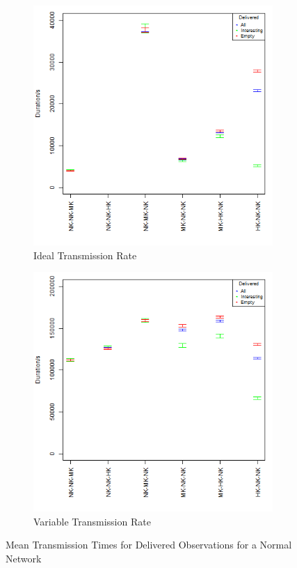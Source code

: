 \begin{figure}[H]

\begin{subfigure}{\textwidth}
\centering
  \includegraphics[height=.5\textheight]{Chap7/figures/plots/normal_ideal/delivered_mean.png}
  \caption{Ideal Transmission Rate}
\label{fig:sim:res:norm:ideal:delmean}
\end{subfigure}%
\vfill
\begin{subfigure}{\textwidth}
\centering
  \includegraphics[height=.5\textheight]{Chap7/figures/plots/normal_variable/delivered_mean.png}
  \caption{Variable Transmission Rate}
	\label{fig:sim:res:norm:variable:delmean}
\end{subfigure}
\caption{Mean Transmission Times for Delivered Observations for a Normal Network}
\end{figure}

